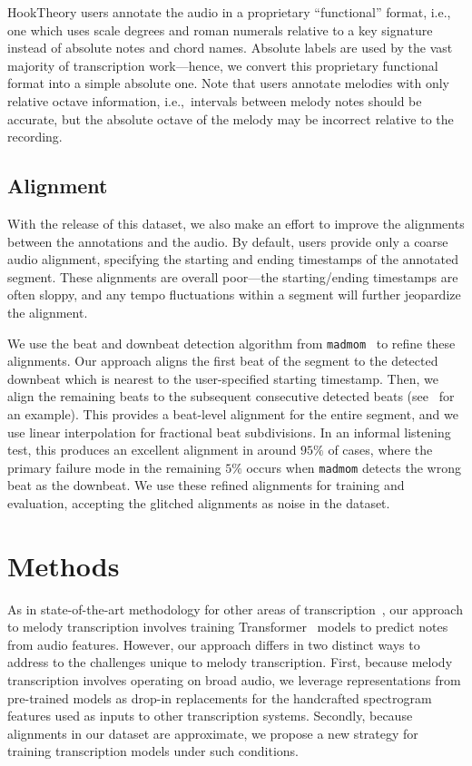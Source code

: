 \documentclass{article}
\newcommand{\madmom}{\texttt{madmom}}
\newcommand{\hooktheory}{HookTheory}
\begin{document}
\hooktheory{} users annotate the audio in a proprietary ``functional'' format, i.e., one which uses scale degrees and roman numerals relative to a key signature instead of absolute notes and chord names. 
Absolute labels are used by the vast majority of transcription work---hence, we convert this proprietary functional format into a simple absolute one. 
Note that users annotate melodies with only relative octave information, i.e.,~intervals between melody notes should be accurate, but the absolute octave of the melody may be incorrect relative to the recording.

\subsection{Alignment}

With the release of this dataset, we also make an effort to improve the alignments between the annotations and the audio. 
By default, users provide only a coarse audio alignment, specifying the starting and ending timestamps of the annotated segment. 
These alignments are overall poor---the starting/ending timestamps are often sloppy, and any tempo fluctuations within a segment will further jeopardize the alignment.

We use the beat and downbeat detection algorithm from \madmom{}~\cite{bock2016joint,bock2016madmom} to refine these alignments. 
Our approach aligns the first beat of the segment to the detected downbeat which is nearest to the user-specified starting timestamp. 
Then, we align the remaining beats to the subsequent consecutive detected beats (see~ for an example). 
This provides a beat-level alignment for the entire segment, and we use linear interpolation for fractional beat subdivisions. 
In an informal listening test, this produces an excellent alignment in around $95\%$ of cases, where the primary failure mode in the remaining $5\%$ occurs when \madmom{} detects the wrong beat as the downbeat. 
We use these refined alignments for training and evaluation, accepting the glitched alignments as noise in the dataset.

\section{Methods}

As in state-of-the-art methodology for other areas of transcription~\cite{hawthorne2021sequence}, 
our approach to melody transcription involves training Transformer~\cite{vaswani2017attention} models to predict notes from audio features. 
However, our approach differs in two distinct ways to address to the challenges unique to melody transcription.
First, because melody transcription involves operating on broad audio, we leverage representations from pre-trained models as drop-in replacements for the handcrafted spectrogram features used as inputs to other transcription systems. 
Secondly, because alignments in our dataset are approximate, we propose a new strategy for training transcription models under such conditions.
\end{document}
